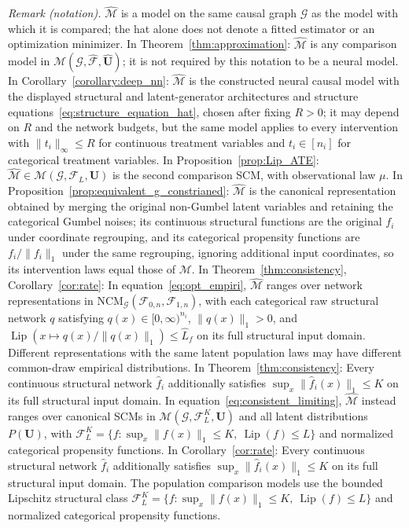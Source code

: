 \documentclass[12pt]{article}
\theoremstyle{plain}
\theoremstyle{definition}
\theoremstyle{remark}
\begin{document}
\noindent\textit{Remark (notation).} $\hat{\mathcal{M}}$ is a model on the same causal graph $\mathcal{G}$ as the model with which it is compared; the hat alone does not denote a fitted estimator or an optimization minimizer. In Theorem~\ref{thm:approximation}: $\hat{\mathcal{M}}$ is any comparison model in $\mathcal{M}(\mathcal{G},\hat{\mathcal{F}},\hat{\boldsymbol{U}})$; it is not required by this notation to be a neural model. In Corollary~\ref{corollary:deep_nn}: $\hat{\mathcal{M}}$ is the constructed neural causal model with the displayed structural and latent-generator architectures and structure equations~\ref{eq:structure_equation_hat}, chosen after fixing $R>0$; it may depend on $R$ and the network budgets, but the same model applies to every intervention with $\|t_i\|_\infty\leqslant R$ for continuous treatment variables and $t_i\in[n_i]$ for categorical treatment variables. In Proposition~\ref{prop:Lip_ATE}: $\hat{\mathcal{M}}\in\mathcal{M}(\mathcal{G},\mathcal{F}_L,\boldsymbol{U})$ is the second comparison SCM, with observational law $\mu$. In Proposition~\ref{prop:equivalent_g_constrianed}: $\hat{\mathcal{M}}$ is the canonical representation obtained by merging the original non-Gumbel latent variables and retaining the categorical Gumbel noises; its continuous structural functions are the original $f_i$ under coordinate regrouping, and its categorical propensity functions are $f_i/\|f_i\|_1$ under the same regrouping, ignoring additional input coordinates, so its intervention laws equal those of $\mathcal{M}$. In Theorem~\ref{thm:consistency}, Corollary~\ref{cor:rate}: In equation~\ref{eq:opt_empiri}, $\hat{\mathcal M}$ ranges over network representations in $\text{NCM}_{\mathcal G}(\mathcal F_{0,n},\mathcal F_{1,n})$, with each categorical raw structural network $q$ satisfying $q(x)\in[0,\infty)^{n_i}$, $\|q(x)\|_1>0$, and $\operatorname{Lip}(x\mapsto q(x)/\|q(x)\|_1)\leqslant\hat L_f$ on its full structural input domain. Different representations with the same latent population laws may have different common-draw empirical distributions. In Theorem~\ref{thm:consistency}: Every continuous structural network $\hat f_i$ additionally satisfies $\sup_x\|\hat f_i(x)\|_1\leqslant K$ on its full structural input domain. In equation~\ref{eq:consistent_limiting}, $\hat{\mathcal M}$ instead ranges over canonical SCMs in $\mathcal M(\mathcal G,\mathcal F_L^K,\boldsymbol U)$ and all latent distributions $P(\boldsymbol U)$, with $\mathcal F_L^K=\{f:\sup_x\|f(x)\|_1\leqslant K,\ \operatorname{Lip}(f)\leqslant L\}$ and normalized categorical propensity functions. In Corollary~\ref{cor:rate}: Every continuous structural network $\hat f_i$ additionally satisfies $\sup_x\|\hat f_i(x)\|_1\leqslant K$ on its full structural input domain. The population comparison models use the bounded Lipschitz structural class $\mathcal F_L^K=\{f:\sup_x\|f(x)\|_1\leqslant K,\ \operatorname{Lip}(f)\leqslant L\}$ and normalized categorical propensity functions.
\end{document}
